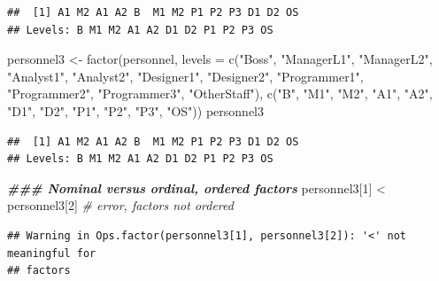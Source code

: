 \documentclass[
]{book}
\newenvironment{Shaded}{\begin{snugshade}}{\end{snugshade}}
\newcommand{\AttributeTok}[1]{\textcolor[rgb]{0.77,0.63,0.00}{#1}}
\newcommand{\CommentTok}[1]{\textcolor[rgb]{0.56,0.35,0.01}{\textit{#1}}}
\newcommand{\DecValTok}[1]{\textcolor[rgb]{0.00,0.00,0.81}{#1}}
\newcommand{\DocumentationTok}[1]{\textcolor[rgb]{0.56,0.35,0.01}{\textbf{\textit{#1}}}}
\newcommand{\FunctionTok}[1]{\textcolor[rgb]{0.00,0.00,0.00}{#1}}
\newcommand{\NormalTok}[1]{#1}
\newcommand{\OtherTok}[1]{\textcolor[rgb]{0.56,0.35,0.01}{#1}}
\newcommand{\SpecialCharTok}[1]{\textcolor[rgb]{0.00,0.00,0.00}{#1}}
\newcommand{\StringTok}[1]{\textcolor[rgb]{0.31,0.60,0.02}{#1}}
\begin{document}
\begin{verbatim}
##  [1] A1 M2 A1 A2 B  M1 M2 P1 P2 P3 D1 D2 OS
## Levels: B M1 M2 A1 A2 D1 D2 P1 P2 P3 OS
\end{verbatim}

\begin{Shaded}
\begin{Highlighting}[]
\NormalTok{personnel3 }\OtherTok{\textless{}{-}} \FunctionTok{factor}\NormalTok{(personnel,}
                     \AttributeTok{levels =} \FunctionTok{c}\NormalTok{(}\StringTok{"Boss"}\NormalTok{, }\StringTok{"ManagerL1"}\NormalTok{, }\StringTok{"ManagerL2"}\NormalTok{,}
                                \StringTok{"Analyst1"}\NormalTok{, }\StringTok{"Analyst2"}\NormalTok{,  }\StringTok{"Designer1"}\NormalTok{,}
                                \StringTok{"Designer2"}\NormalTok{, }\StringTok{"Programmer1"}\NormalTok{, }\StringTok{"Programmer2"}\NormalTok{,}
                                \StringTok{"Programmer3"}\NormalTok{, }\StringTok{"OtherStaff"}\NormalTok{),}
                     \FunctionTok{c}\NormalTok{(}\StringTok{"B"}\NormalTok{, }\StringTok{"M1"}\NormalTok{, }\StringTok{"M2"}\NormalTok{, }\StringTok{"A1"}\NormalTok{, }\StringTok{"A2"}\NormalTok{, }\StringTok{"D1"}\NormalTok{, }\StringTok{"D2"}\NormalTok{,}
                       \StringTok{"P1"}\NormalTok{, }\StringTok{"P2"}\NormalTok{, }\StringTok{"P3"}\NormalTok{, }\StringTok{"OS"}\NormalTok{))}
\NormalTok{personnel3}
\end{Highlighting}
\end{Shaded}

\begin{verbatim}
##  [1] A1 M2 A1 A2 B  M1 M2 P1 P2 P3 D1 D2 OS
## Levels: B M1 M2 A1 A2 D1 D2 P1 P2 P3 OS
\end{verbatim}

\begin{Shaded}
\begin{Highlighting}[]
\DocumentationTok{\#\#\# Nominal versus ordinal, ordered factors}
\NormalTok{personnel3[}\DecValTok{1}\NormalTok{] }\SpecialCharTok{\textless{}}\NormalTok{ personnel3[}\DecValTok{2}\NormalTok{]  }\CommentTok{\# error, factors not ordered}
\end{Highlighting}
\end{Shaded}

\begin{verbatim}
## Warning in Ops.factor(personnel3[1], personnel3[2]): '<' not meaningful for
## factors
\end{verbatim}
\end{document}
